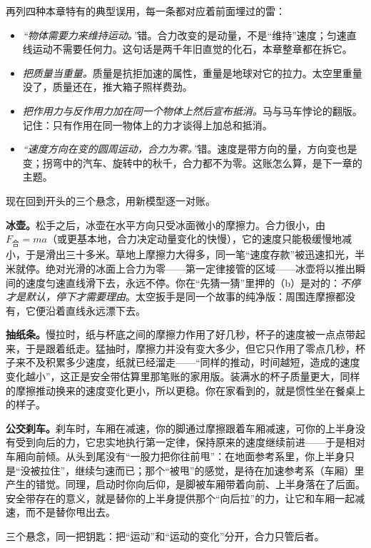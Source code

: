 再列四种本章特有的典型误用，每一条都对应着前面埋过的雷：

\begin{itemize}[leftmargin=1.8em]
  \item \emph{“物体需要力来维持运动。”}错。合力改变的是动量，不是“维持”速度；匀速直线运动不需要任何力。这句话是两千年旧直觉的化石，本章整章都在拆它。
  \item \emph{把质量当重量。}质量是抗拒加速的属性，重量是地球对它的拉力。太空里重量没了，质量还在，推大箱子照样费劲。
  \item \emph{把作用力与反作用力加在同一个物体上然后宣布抵消。}马与马车悖论的翻版。记住：只有作用在同一物体上的力才谈得上加总和抵消。
  \item \emph{“速度方向在变的圆周运动，合力为零。”}错。速度是带方向的量，方向变也是变；拐弯中的汽车、旋转中的秋千，合力都不为零。这账怎么算，是下一章的主题。
\end{itemize}


现在回到开头的三个悬念，用新模型逐一对账。

\textbf{冰壶。}松手之后，冰壶在水平方向只受冰面微小的摩擦力。合力很小，由 \(F_{\text{合}}=ma\)（或更基本地，合力决定动量变化的快慢），它的速度只能极缓慢地减小，于是滑出三十多米。草地上摩擦力大得多，同一笔“速度存款”被迅速扣光，半米就停。绝对光滑的冰面上合力为零——第一定律接管的区域——冰壶将以推出瞬间的速度匀速直线滑下去，永远不停。你在“先猜一猜”里押的（b）是对的：\emph{不停才是默认，停下才需要理由}。太空扳手是同一个故事的纯净版：周围连摩擦都没有，它便沿着直线永远漂下去。

\textbf{抽纸条。}慢拉时，纸与杯底之间的摩擦力作用了好几秒，杯子的速度被一点点带起来，于是跟着纸走。猛抽时，摩擦力并没有变大多少，但它只作用了零点几秒，杯子来不及积累多少速度，纸就已经溜走——“同样的推动，时间越短，造成的速度变化越小”，这正是安全带估算里那笔账的家用版。装满水的杯子质量更大，同样的摩擦推动换来的速度变化更小，所以更稳。你在家看到的，就是惯性坐在餐桌上的样子。

\textbf{公交刹车。}刹车时，车厢在减速，你的脚通过摩擦跟着车厢减速，可你的上半身没有受到向后的力，它忠实地执行第一定律，保持原来的速度继续前进——于是相对车厢向前倾。从头到尾没有“一股力把你往前甩”：在地面参考系里，你上半身只是“没被拉住”，继续匀速而已；那个“被甩”的感觉，是待在加速参考系（车厢）里产生的错觉。同理，启动时你向后仰，是脚被车厢带着向前、上半身落在了后面。安全带存在的意义，就是替你的上半身提供那个“向后拉”的力，让它和车厢一起减速，而不是替你甩出去。

三个悬念，同一把钥匙：把“运动”和“运动的变化”分开，合力只管后者。

